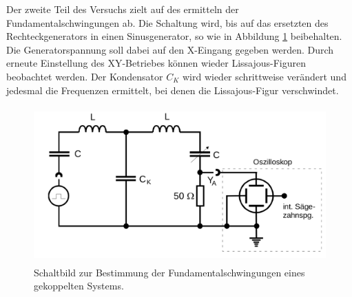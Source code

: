 Der zweite Teil des Versuchs zielt auf des ermitteln der Fundamentalschwingungen ab. Die Schaltung wird, bis auf das ersetzten des Rechteckgenerators in
einen Sinusgenerator, so wie in Abbildung \ref{fig:Bild6} beibehalten. Die Generatorspannung soll dabei auf den X-Eingang gegeben werden.
Durch erneute Einstellung des XY-Betriebes können wieder Lissajous-Figuren beobachtet werden. Der Kondensator $C_K$ wird wieder schrittweise verändert und jedesmal die Frequenzen ermittelt, bei 
denen die Lissajous-Figur verschwindet. 


\begin{figure}
\label{fig:Bild6}
    \centering
    \includegraphics[height=6.0cm]{data/Bild6.png}
    \caption{Schaltbild zur Bestimmung der Fundamentalschwingungen eines gekoppelten Systems.}
\end{figure}






